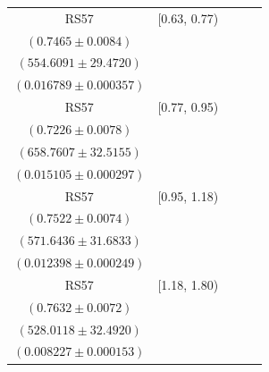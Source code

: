 {\begin{longtable}{|c|c|c|c|c|}
RS57 & [0.63, 0.77) & \begin{tabular}{@{}c@{}}$0.7401 \pm 0.0085$ \\ $(0.7465 \pm 0.0084)$\end{tabular} & \begin{tabular}{@{}c@{}}$559.3894 \pm 29.7260$ \\ $(554.6091 \pm 29.4720)$\end{tabular} & \begin{tabular}{@{}c@{}}$0.013498 \pm 0.000600$ \\ $(0.016789 \pm 0.000357)$\end{tabular} \\ \hline
RS57 & [0.77, 0.95) & \begin{tabular}{@{}c@{}}$0.7200 \pm 0.0083$ \\ $(0.7226 \pm 0.0078)$\end{tabular} & \begin{tabular}{@{}c@{}}$661.1379 \pm 32.6328$ \\ $(658.7607 \pm 32.5155)$\end{tabular} & \begin{tabular}{@{}c@{}}$0.013773 \pm 0.000532$ \\ $(0.015105 \pm 0.000297)$\end{tabular} \\ \hline
RS57 & [0.95, 1.18) & \begin{tabular}{@{}c@{}}$0.7131 \pm 0.0092$ \\ $(0.7522 \pm 0.0074)$\end{tabular} & \begin{tabular}{@{}c@{}}$602.9886 \pm 33.4206$ \\ $(571.6436 \pm 31.6833)$\end{tabular} & \begin{tabular}{@{}c@{}}$0.011832 \pm 0.000456$ \\ $(0.012398 \pm 0.000249)$\end{tabular} \\ \hline
RS57 & [1.18, 1.80) & \begin{tabular}{@{}c@{}}$0.6848 \pm 0.0104$ \\ $(0.7632 \pm 0.0072)$\end{tabular} & \begin{tabular}{@{}c@{}}$588.5218 \pm 36.2155$ \\ $(528.0118 \pm 32.4920)$\end{tabular} & \begin{tabular}{@{}c@{}}$0.007889 \pm 0.000280$ \\ $(0.008227 \pm 0.000153)$\end{tabular} \\ \hline
\end{longtable}
}
